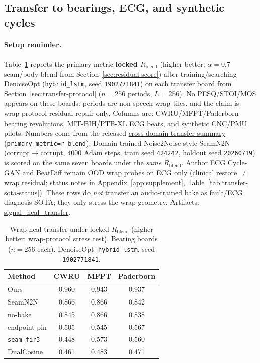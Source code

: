 \subsection{Transfer to bearings, ECG, and synthetic cycles}
\label{sec:transfer-main}

\paragraph{Setup reminder.}
Table~\ref{tab:transfer-main} reports the primary metric \textbf{locked $R_{\mathrm{blend}}$} (higher better; $\alpha{=}0.7$ seam/body blend from Section~\ref{sec:residual-score}) after training/searching DenoiseOpt
(\texttt{hybrid\_lstm}, seed \texttt{1902771841}) on each transfer board
from Section~\ref{sec:transfer-protocol} ($n{=}256$ periods, $L{=}256$).
No PESQ/STOI/MOS appears on these boards: periods are non-speech wrap tiles, and the claim is wrap-protocol residual repair only.
Columns are: CWRU/MFPT/Paderborn bearing revolutions, MIT-BIH/PTB-XL ECG beats, and synthetic CNC/PMU pilots.
Numbers come from the released
\href{https://github.com/reeldemo/denoise-opt}{cross-domain transfer summary}
(\texttt{primary\_metric=r\_blend}).
Domain-trained Noise2Noise-style SeamN2N (corrupt$\to$corrupt, $4000$ Adam steps, train seed \texttt{424242}, holdout seed \texttt{20260719})
is scored on the same seven boards under the \emph{same} $R_{\mathrm{blend}}$.
Author ECG Cycle-GAN and BeatDiff remain OOD wrap probes on ECG only
(clinical restore $\neq$ wrap residual; status notes in Appendix~\ref{app:supplement}, Table~\ref{tab:transfer-sota-status}).
These rows do \emph{not} transfer an audio-trained bake as fault/ECG diagnosis SOTA; they only stress the wrap geometry.
Artifacts:
\href{https://github.com/reeldemo/denoise-opt}{signal\_heal\_transfer}.

\begin{table}[t]
  \centering
  \caption{Wrap-heal transfer under locked $R_{\mathrm{blend}}$ (higher better; wrap-protocol stress test).
  Bearing boards ($n{=}256$ each). DenoiseOpt: \texttt{hybrid\_lstm}, seed \texttt{1902771841}.}
  \label{tab:transfer-main}
  \setlength{\tabcolsep}{3pt}
  \footnotesize
  \begin{tabular}{@{}lccc@{}}
    \toprule
    Method & CWRU & MFPT & Paderborn \\
    \midrule
    Ours & 0.960 & 0.943 & 0.937 \\
    SeamN2N & 0.866 & 0.866 & 0.842 \\
    no-bake & 0.845 & 0.866 & 0.838 \\
    endpoint-pin & 0.505 & 0.545 & 0.567 \\
    \texttt{seam\_fir3} & 0.448 & 0.573 & 0.560 \\
    DualCosine & 0.461 & 0.483 & 0.471 \\
    \bottomrule
  \end{tabular}
\end{table}

